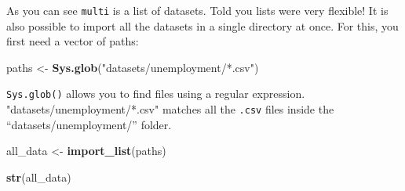 \documentclass[]{gitbook}
\newenvironment{Shaded}{\begin{snugshade}}{\end{snugshade}}
\newcommand{\KeywordTok}[1]{\textcolor[rgb]{0.13,0.29,0.53}{\textbf{#1}}}
\newcommand{\NormalTok}[1]{#1}
\newcommand{\StringTok}[1]{\textcolor[rgb]{0.31,0.60,0.02}{#1}}
\begin{document}
As you can see \texttt{multi} is a list of datasets. Told you lists were very flexible! It is also possible
to import all the datasets in a single directory at once. For this, you first need a vector of paths:

\begin{Shaded}
\begin{Highlighting}[]
\NormalTok{paths <-}\StringTok{ }\KeywordTok{Sys.glob}\NormalTok{(}\StringTok{"datasets/unemployment/*.csv"}\NormalTok{)}
\end{Highlighting}
\end{Shaded}

\texttt{Sys.glob()} allows you to find files using a regular expression. "datasets/unemployment/*.csv"
matches all the \texttt{.csv} files inside the ``datasets/unemployment/'' folder.

\begin{Shaded}
\begin{Highlighting}[]
\NormalTok{all_data <-}\StringTok{ }\KeywordTok{import_list}\NormalTok{(paths)}

\KeywordTok{str}\NormalTok{(all_data)}
\end{Highlighting}
\end{Shaded}
\end{document}
